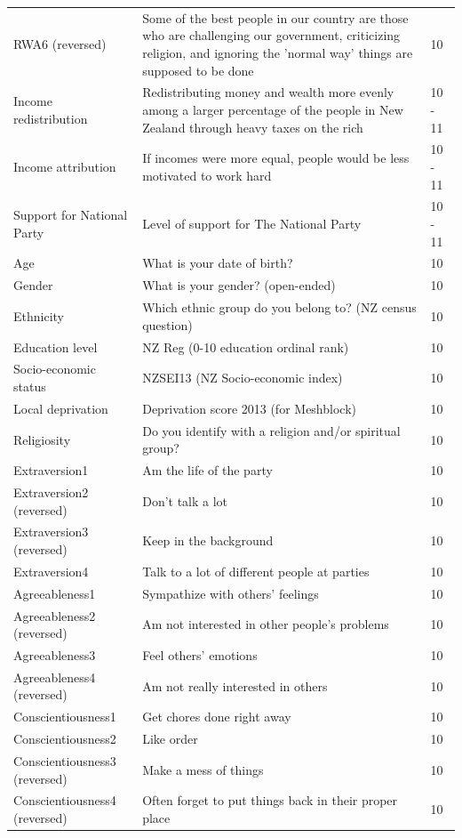 \documentclass[
  man,floatsintext]{apa6}
\newenvironment{lltable}{\begin{landscape}\centering\begin{ThreePartTable}}{\end{ThreePartTable}\end{landscape}}
\begin{document}
\begin{lltable}
{\begin{longtable}{p{5cm}p{14cm}p{1cm}}
RWA6 (reversed) & Some of the best people in our country are those who are challenging our government, criticizing religion, and ignoring the 'normal way' things are supposed to be done & 10\\
Income redistribution & Redistributing money and wealth more evenly among a larger percentage of the people in New Zealand through heavy taxes on the rich & 10 - 11\\
Income attribution & If incomes were more equal, people would be less motivated to work hard & 10 - 11\\
Support for National Party & Level of support for The National Party & 10 - 11\\
Age & What is your date of birth? & 10\\
Gender & What is your gender? (open-ended) & 10\\
Ethnicity & Which ethnic group do you belong to? (NZ census question) & 10\\
Education level & NZ Reg (0-10 education ordinal rank) & 10\\
Socio-economic status & NZSEI13 (NZ Socio-economic index) & 10\\
Local deprivation & Deprivation score 2013 (for Meshblock) & 10\\
Religiosity & Do you identify with a religion and/or spiritual group? & 10\\
Extraversion1 & Am the life of the party & 10\\
Extraversion2 (reversed) & Don't talk a lot & 10\\
Extraversion3 (reversed) & Keep in the background & 10\\
Extraversion4 & Talk to a lot of different people at parties & 10\\
Agreeableness1 & Sympathize with others' feelings & 10\\
Agreeableness2 (reversed) & Am not interested in other people's problems & 10\\
Agreeableness3 & Feel others' emotions & 10\\
Agreeableness4 (reversed) & Am not really interested in others & 10\\
Conscientiousness1 & Get chores done right away & 10\\
Conscientiousness2 & Like order & 10\\
Conscientiousness3 (reversed) & Make a mess of things & 10\\
Conscientiousness4 (reversed) & Often forget to put things back in their proper place & 10\\

\end{longtable}}
\end{lltable}
\end{document}
